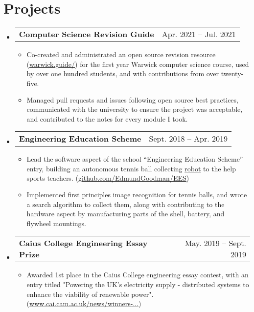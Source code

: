 \documentclass[letterpaper,11pt]{article}
\makeatletter
\newcommand{\resumeItem}[1]{
  \item\small{
    {#1 \vspace{-2pt}}
  }
}
\newcommand{\resumeProjectHeading}[2]{
    \item
    \begin{tabular*}{0.97\textwidth}{l@{\extracolsep{\fill}}r}
      \textbf{#1} & #2 \\
    \end{tabular*}\vspace{-7pt}
}
\newcommand{\resumeSubHeadingListStart}{\begin{itemize}[leftmargin=0.15in, label={}]}
\newcommand{\resumeSubHeadingListEnd}{\end{itemize}}
\newcommand{\resumeItemListStart}{\begin{itemize}[leftmargin=0.2in]}
\newcommand{\resumeItemListEnd}{\end{itemize}\vspace{-5pt}}
\makeatother
\begin{document}
\section{Projects}
  \resumeSubHeadingListStart
    \resumeProjectHeading
      {Computer Science Revision Guide}{Apr. 2021 -- Jul. 2021}
      \resumeItemListStart
        \resumeItem{Co-created and administrated an open source revision resource (\href{https://warwick.guide/}{\underline{warwick.guide/}}) for the first year Warwick computer science course, used by over one hundred students, and with contributions from over twenty-five.}
        \resumeItem{Managed pull requests and issues following open source best practices, communicated with the university to ensure the project was acceptable, and contributed to the notes for every module I took.}
      \resumeItemListEnd

    \resumeProjectHeading
      {Engineering Education Scheme}{Sept. 2018 -- Apr. 2019}
      \resumeItemListStart
        \resumeItem{Lead the software aspect of the school ``Engineering Education Scheme'' entry, building an autonomous tennis ball collecting \href{https://drive.google.com/file/d/1t9qVtQVATlVSCroJkCgrlD1hFjH6NqUE/view}{\underline{robot}} to the help sports teachers. (\href{https://github.com/EdmundGoodman/EES}{\underline{github.com/EdmundGoodman/EES}})}
        \resumeItem{Implemented first principles image recognition for tennis balls, and wrote a search algorithm to collect them, along with contributing to the hardware aspect by manufacturing parts of the shell, battery, and flywheel mountings.}
      \resumeItemListEnd

    \resumeProjectHeading
      {Caius College Engineering Essay Prize}{May. 2019 -- Sept. 2019}
      \resumeItemListStart
        \resumeItem{Awarded 1st place in the Caius College engineering essay contest, with an entry titled "Powering the UK's electricity supply - distributed systems to enhance the viability of renewable power". (\href{https://www.cai.cam.ac.uk/news/winners-announced-2019-caius-prizes}{\underline{www.cai.cam.ac.uk/news/winners-...}})}
      \resumeItemListEnd

  \resumeSubHeadingListEnd


%
\end{document}

